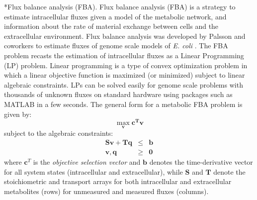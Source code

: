 \documentclass[11pt]{article}
\makeatletter
\theoremstyle{definition}
\renewcommand\subsection{\@startsection
	{subsection}{2}{0mm}
	{-0.05in}
	{-0.5\baselineskip}
	{\normalfont\normalsize\bfseries}}
\makeatother
\begin{document}
\subsection*{Flux balance analysis (FBA).}
Flux balance analysis (FBA) is a strategy to estimate intracellular fluxes given a model of the metabolic network, and information about the rate of material exchange between
cells and the extracellular environment.
Flux balance analysis was developed by Palsson and coworkers to estimate fluxes of genome scale models of \emph{E. coli} \citep{Edwards:2000yq}.
The FBA problem recasts the estimation of intracellular fluxes as a Linear Programming (LP) problem.
Linear programming is a type of convex optimization problem in which a linear objective function is maximized (or minimized) subject to linear algebraic constraints.
LPs can be solved easily for genome scale problems with thousands of unknown fluxes on standard hardware using packages such as MATLAB in a few seconds.
The general form for a metabolic FBA problem is given by:
\begin{equation}
	\max_{\mathbf{v}}\mathbf{c^{T}}\mathbf{v}
\end{equation}
subject to the algebraic constraints:
\begin{eqnarray}
	\mathbf{S}\mathbf{v} + \mathbf{T}\mathbf{q} &\leq& \mathbf{b} \\
	\mathbf{v},\mathbf{q}&\geq&\mathbf{0}
\end{eqnarray}
where $\mathbf{c}^{T}$ is the \textit{objective selection vector} and $\mathbf{b}$ denotes the time-derivative vector for all system states (intracellular and extracellular), while
$\mathbf{S}$ and $\mathbf{T}$ denote the stoichiometric and transport arrays for both intracellular and extracellular metabolites (rows) for unmeasured and measured fluxes (columns).
\end{document}
